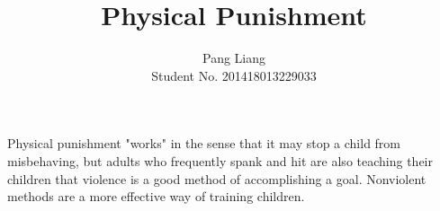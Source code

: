 \documentclass[12pt]{article}
\title{Physical Punishment}
\author{Pang Liang\\ Student No. 201418013229033}
\begin{document}
\maketitle

Physical punishment "works" in the sense that it may stop a child from misbehaving, but adults who frequently spank and hit are also teaching their children that violence is a good method of accomplishing a goal. Nonviolent methods are a more effective way of training children.\\
\end{document}
